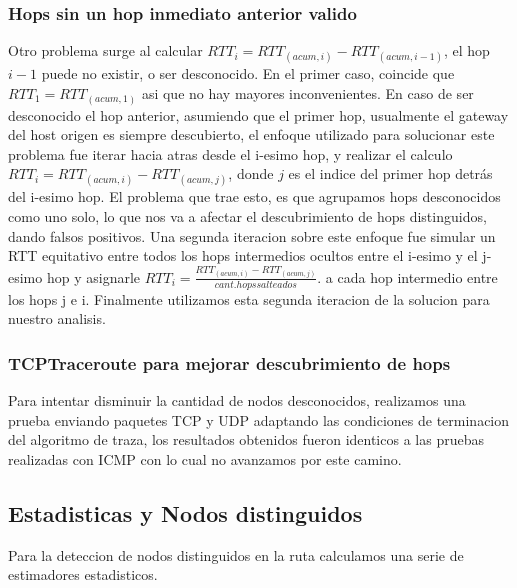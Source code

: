 \subsubsection{Hops sin un hop inmediato anterior valido}
Otro problema surge al calcular $RTT_i = RTT_{(acum, i)} - RTT_{(acum, i-1)}$, 
el hop $i-1$ puede no existir, o ser desconocido. En el primer caso, coincide que $RTT_1 = RTT_{(acum, 1)}$ asi que no hay mayores inconvenientes. En caso de ser desconocido el hop anterior, asumiendo que el primer hop, usualmente el gateway del host origen es siempre descubierto, el enfoque utilizado para solucionar este problema fue iterar hacia atras desde el i-esimo hop, y realizar el calculo $RTT_i = RTT_{(acum, i)} - RTT_{(acum, j)}$, donde $j$ es el indice del primer hop detr\'as del i-esimo hop. El problema que trae esto, es que agrupamos hops desconocidos como uno solo, lo que nos va a afectar el descubrimiento de hops distinguidos, dando falsos positivos. Una segunda iteracion sobre este enfoque fue simular un RTT equitativo entre todos los hops intermedios ocultos entre el i-esimo y el j-esimo hop y asignarle $RTT_i = \frac{RTT_{(acum, i)} - RTT_{(acum, j)}}{cant. hops salteados}$. a cada hop intermedio entre los hops j e i. Finalmente utilizamos esta segunda iteracion de la solucion para nuestro analisis.


\subsubsection{TCPTraceroute para mejorar descubrimiento de hops}
Para intentar disminuir la cantidad de nodos desconocidos, realizamos una prueba enviando paquetes TCP y UDP adaptando las condiciones de terminacion del algoritmo de traza, los resultados obtenidos fueron identicos a las pruebas realizadas con ICMP con lo cual no avanzamos por este camino.

\subsection{Estadisticas y Nodos distinguidos}
Para la deteccion de nodos distinguidos en la ruta calculamos una serie de estimadores estadisticos.
